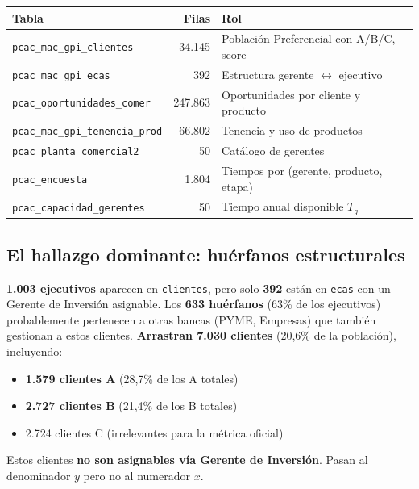 \documentclass[11pt,a4paper]{article}
\newcommand{\rowamarillo}{\rowcolor{bcoamarilloclaro!30}}
\begin{document}
\begin{center}
\begin{tabular}{l r l}
\toprule
\rowcolor{bconegro}\textbf{\color{bcoamarillo}Tabla} & \textbf{\color{bcoamarillo}Filas} & \textbf{\color{bcoamarillo}Rol} \\
\midrule
\rowamarillo \texttt{pcac\_mac\_gpi\_clientes} & 34.145 & Población Preferencial con A/B/C, score \\
\texttt{pcac\_mac\_gpi\_ecas} & 392 & Estructura gerente $\leftrightarrow$ ejecutivo \\
\rowamarillo \texttt{pcac\_oportunidades\_comer} & 247.863 & Oportunidades por cliente y producto \\
\texttt{pcac\_mac\_gpi\_tenencia\_prod} & 66.802 & Tenencia y uso de productos \\
\rowamarillo \texttt{pcac\_planta\_comercial2} & 50 & Catálogo de gerentes \\
\texttt{pcac\_encuesta} & 1.804 & Tiempos por (gerente, producto, etapa) \\
\rowamarillo \texttt{pcac\_capacidad\_gerentes} & 50 & Tiempo anual disponible $T_g$ \\
\bottomrule
\end{tabular}
\end{center}

\subsection{El hallazgo dominante: huérfanos estructurales}

\begin{honestybox}
\textbf{1.003 ejecutivos} aparecen en \texttt{clientes}, pero solo \textbf{392} están en \texttt{ecas} con un Gerente de Inversión asignable. Los \textbf{633 huérfanos} (63\% de los ejecutivos) probablemente pertenecen a otras bancas (PYME, Empresas) que también gestionan a estos clientes. \textbf{Arrastran 7.030 clientes} (20,6\% de la población), incluyendo:

\medskip
\begin{itemize}
    \item \textbf{1.579 clientes A} (28,7\% de los A totales)
    \item \textbf{2.727 clientes B} (21,4\% de los B totales)
    \item 2.724 clientes C (irrelevantes para la métrica oficial)
\end{itemize}

\medskip
Estos clientes \textbf{no son asignables vía Gerente de Inversión}. Pasan al denominador $y$ pero no al numerador $x$.
\end{honestybox}
\end{document}
